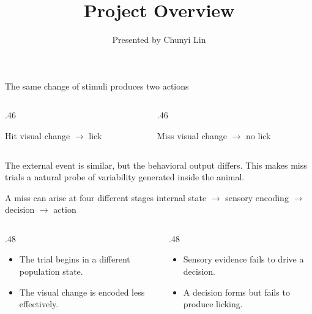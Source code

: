 \documentclass[aspectratio=169,10pt]{beamer}
\title[NMA Project Overview]{Project Overview}
\author[C. Lin]{Presented by Chunyi Lin}
\date{}
\begin{document}
\begin{frame}[plain]
  \titlepage
\end{frame}

\begin{frame}{The same change of stimuli produces two actions}

  \begin{columns}[c,onlytextwidth]
    \begin{column}{.46\textwidth}
      \begin{block}{Hit}
        \centering\Large visual change $\rightarrow$ lick
      \end{block}
    \end{column}
    \begin{column}{.46\textwidth}
      \begin{alertblock}{Miss}
        \centering\Large visual change $\rightarrow$ no lick
      \end{alertblock}
    \end{column}
  \end{columns}

  \vspace{1em}
  The external event is similar, but the behavioral output differs. This makes
  miss trials a natural probe of variability generated inside the animal.

\end{frame}

\begin{frame}{A miss can arise at four different stages}
  \centering
  {\Large
    internal state $\longrightarrow$ sensory encoding
    $\longrightarrow$ decision $\longrightarrow$ action
  }

  \vspace{1.1em}
  \begin{columns}[T,onlytextwidth]
    \begin{column}{.48\textwidth}
      \begin{itemize}
        \item The trial begins in a different population state.
        \item The visual change is encoded less effectively.
      \end{itemize}
    \end{column}
    \begin{column}{.48\textwidth}
      \begin{itemize}
        \item Sensory evidence fails to drive a decision.
        \item A decision forms but fails to produce licking.
      \end{itemize}
    \end{column}
  \end{columns}

\end{frame}
\end{document}
